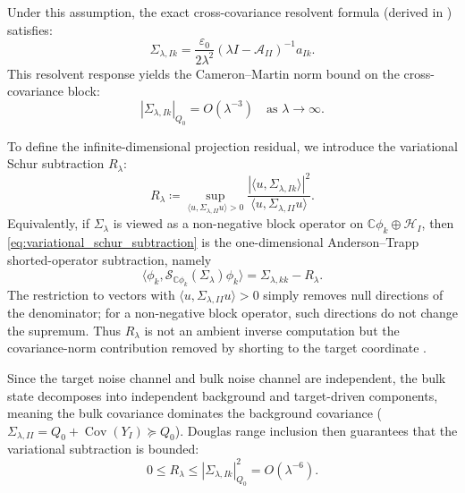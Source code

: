 \documentclass[11pt]{amsart}
\theoremstyle{plain}
\theoremstyle{definition}
\theoremstyle{remark}
\begin{document}
Under this assumption, the exact cross-covariance resolvent formula (derived in ) satisfies:
\begin{equation}
  \Sigma_{\lambda,Ik} = \frac{\varepsilon_0}{2\lambda^2} (\lambda I - \mathcal{A}_{II})^{-1} a_{Ik}.
\end{equation}
This resolvent response yields the Cameron--Martin norm bound on the cross-covariance block:
\begin{equation}
  \label{eq:cross_norm_bound}
  |\Sigma_{\lambda,Ik}|_{Q_0} = O(\lambda^{-3}) \quad \text{as } \lambda \to \infty.
\end{equation}

To define the infinite-dimensional projection residual, we introduce the variational Schur subtraction $R_\lambda$:
\begin{equation}
  \label{eq:variational_schur_subtraction}
  R_\lambda \coloneqq \sup_{\langle u, \Sigma_{\lambda,II} u \rangle > 0} \frac{|\langle u, \Sigma_{\lambda,Ik} \rangle|^2}{\langle u, \Sigma_{\lambda,II} u \rangle}.
\end{equation}
Equivalently, if $\Sigma_\lambda$ is viewed as a non-negative block operator on $\mathbb{C}\phi_k\oplus\mathcal{H}_I$, then \eqref{eq:variational_schur_subtraction} is the one-dimensional Anderson--Trapp shorted-operator subtraction, namely
\begin{equation}
  \label{eq:shorted_operator_scalar}
  \big\langle \phi_k,\mathcal{S}_{\mathbb{C}\phi_k}(\Sigma_\lambda)\phi_k\big\rangle
  =\Sigma_{\lambda,kk}-R_\lambda.
\end{equation}
The restriction to vectors with $\langle u,\Sigma_{\lambda,II}u\rangle>0$ simply removes null directions of the denominator; for a non-negative block operator, such directions do not change the supremum. Thus $R_\lambda$ is not an ambient inverse computation but the covariance-norm contribution removed by shorting to the target coordinate \cite{anderson1975shorted,owhadi2015conditioning}.

Since the target noise channel and bulk noise channel are independent, the bulk state decomposes into independent background and target-driven components, meaning the bulk covariance dominates the background covariance ($\Sigma_{\lambda,II} = Q_0 + \operatorname{Cov}(Y_I) \succeq Q_0$). Douglas range inclusion then guarantees that the variational subtraction is bounded:
\begin{equation}
  0 \le R_\lambda \le |\Sigma_{\lambda,Ik}|_{Q_0}^2 = O(\lambda^{-6}).
\end{equation}
\end{document}
